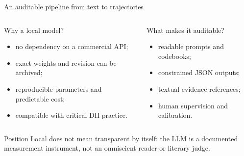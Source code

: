 \documentclass[10pt,aspectratio=169]{beamer}
\begin{document}
\begin{frame}{An auditable pipeline from text to trajectories}
  \centering

  \vspace{4mm}
  \begin{columns}[T,onlytextwidth]
      \begin{block}{Why a local model?}
        \footnotesize
        \begin{itemize}
          \setlength{\itemsep}{1pt}
          \item no dependency on a commercial API;
          \item exact weights and revision can be archived;
          \item reproducible parameters and predictable cost;
          \item compatible with critical DH practice.
        \end{itemize}
      \end{block}
      \begin{block}{What makes it auditable?}
        \footnotesize
        \begin{itemize}
          \setlength{\itemsep}{1pt}
          \item readable prompts and codebooks;
          \item constrained JSON outputs;
          \item textual evidence references;
          \item human supervision and calibration.
        \end{itemize}
      \end{block}
  \end{columns}

  \begin{alertblock}{\small Position}
    \footnotesize
    Local does not mean transparent by itself: the LLM is a documented measurement
    instrument, not an omniscient reader or literary judge.
  \end{alertblock}
\end{frame}
\end{document}
